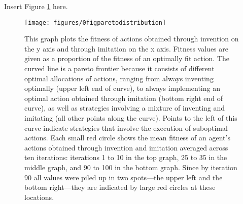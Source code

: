 \documentclass[a4paper,12pt,man,british]{apa6}
\begin{document}

\begin{center} %
Insert Figure \ref{fig:F3-agent-distribution} here.
\end{center}

\begin{figure} %
\centering
\texttt{[image: figures/0figparetodistribution]}
\caption{This graph plots the fitness of actions obtained through invention on the y axis and through imitation on the x axis. Fitness values are given as a proportion of the fitness of an optimally fit action. The curved line is a pareto frontier because it consists of different optimal allocations of actions, ranging from always inventing optimally (upper left end of curve), to always implementing an optimal action obtained through imitation (bottom right end of curve), as well as strategies involving a mixture of inventing and imitating (all other points along the curve). Points to the left of this curve indicate strategies that involve the execution of suboptimal actions. Each small red circle shows the mean fitness of an agent's actions obtained through invention and imitation averaged across ten iterations: iterations 1 to 10 in the top graph, 25 to 35 in the middle graph, and 90 to 100 in the bottom graph. Since by iteration 90 all values were piled up in two spots---the upper left and the bottom right---they are indicated by large red circles at these locations.}
\label{fig:F3-agent-distribution}
\end{figure}
\end{document}
